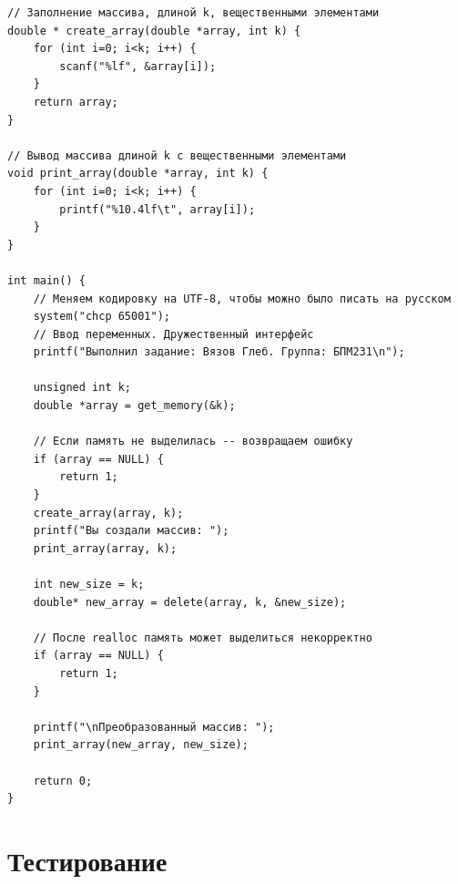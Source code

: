 \documentclass[12pt]{article}
\begin{document}
\begin{lstlisting}[label=string_code1,caption=C]
// Заполнение массива, длиной k, вещественными элементами
double * create_array(double *array, int k) {
    for (int i=0; i<k; i++) {
        scanf("%lf", &array[i]);
    }
    return array;
}

// Вывод массива длиной k с вещественными элементами
void print_array(double *array, int k) {
    for (int i=0; i<k; i++) {
        printf("%10.4lf\t", array[i]);
    }
}

int main() {
    // Меняем кодировку на UTF-8, чтобы можно было писать на русском
    system("chcp 65001");
    // Ввод переменных. Дружественный интерфейс
    printf("Выполнил задание: Вязов Глеб. Группа: БПМ231\n");

    unsigned int k;
    double *array = get_memory(&k);

    // Если память не выделилась -- возвращаем ошибку
    if (array == NULL) {
        return 1;
    }
    create_array(array, k);
    printf("Вы создали массив: ");
    print_array(array, k);

    int new_size = k;
    double* new_array = delete(array, k, &new_size);

    // После realloc память может выделиться некорректно
    if (array == NULL) {
        return 1;
    }

    printf("\nПреобразованный массив: ");
    print_array(new_array, new_size);

    return 0;
}

\end{lstlisting} 

\newpage


\section*{Тестирование}
\end{document}

